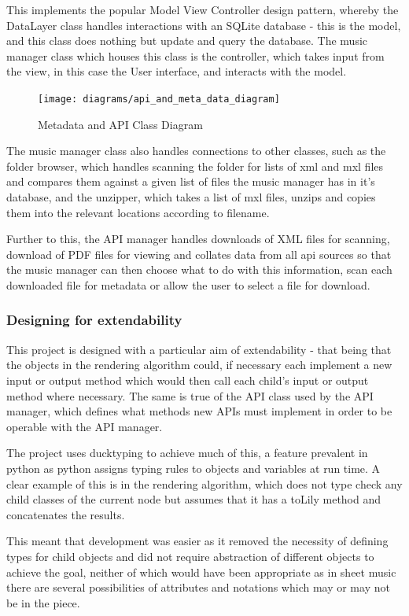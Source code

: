 This implements the popular Model View Controller design pattern, whereby the DataLayer class handles interactions with an SQLite database - this is the model, and this class does nothing but update and query the database. The music manager class which houses this class is the controller, which takes input from the view, in this case the User interface, and interacts with the model.
\begin{figure}[H]
    \centering
    \texttt{[image: diagrams/api\_and\_meta\_data\_diagram]}
    \caption{Metadata and API Class Diagram}
    \label{fig:metadiagram}
\end{figure}
The music manager class also handles connections to other classes, such as the folder browser, which handles scanning the folder for lists of xml and mxl files and compares them against a given list of files the music manager has in it's database, and the unzipper, which takes a list of mxl files, unzips and copies them into the relevant locations according to filename. 

Further to this, the API manager handles downloads of XML files for scanning, download of PDF files for viewing and collates data from all api sources so that the music manager can then choose what to do with this information, scan each downloaded file for metadata or allow the user to select a file for download. 

\subsubsection{Designing for extendability}
This project is designed with a particular aim of extendability - that being that the objects in the rendering algorithm could, if necessary each implement a new input or output method which would then call each child's input or output method where necessary. The same is true of the API class used by the API manager, which defines what methods new APIs must implement in order to be operable with the API manager.

The project uses ducktyping to achieve much of this, a feature prevalent in python as python assigns typing rules to objects and variables at run time. A clear example of this is in the rendering algorithm, which does not type check any child classes of the current node but assumes that it has a toLily method and concatenates the results. 

This meant that development was easier as it removed the necessity of defining types for child objects and did not require abstraction of different objects to achieve the goal, neither of which would have been appropriate as in sheet music there are several possibilities of attributes and notations which may or may not be in the piece.


